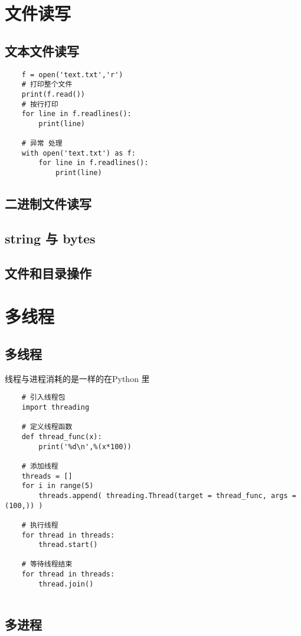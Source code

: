 \documentclass[UTF8,a4paper,12pt]{ctexbook}
\begin{document}
	\section{文件读写}
		\subsection{文本文件读写}
			\begin{lstlisting}
	f = open('text.txt','r')
	# 打印整个文件
	print(f.read())
	# 按行打印
	for line in f.readlines():
		print(line)
		
	# 异常 处理
	with open('text.txt') as f:
		for line in f.readlines():
			print(line)
			\end{lstlisting}
		
	
		\subsection{二进制文件读写}
		
		\subsection{string 与 bytes}
		
		\subsection{文件和目录操作}
			
	\section{多线程}
		\subsection{多线程}线程与进程消耗的是一样的在Python 里
		
			\begin{lstlisting}
	# 引入线程包
	import threading
	 
	# 定义线程函数
	def thread_func(x):
		print('%d\n',%(x*100))
	
	# 添加线程	
	threads = []
	for i in range(5)
		threads.append( threading.Thread(target = thread_func, args = (100,)) )
	
	# 执行线程
	for thread in threads:
		thread.start()
	
	# 等待线程结束
	for thread in threads:
		thread.join()
	
			\end{lstlisting}
		\subsection{多进程}
		
\end{document}
